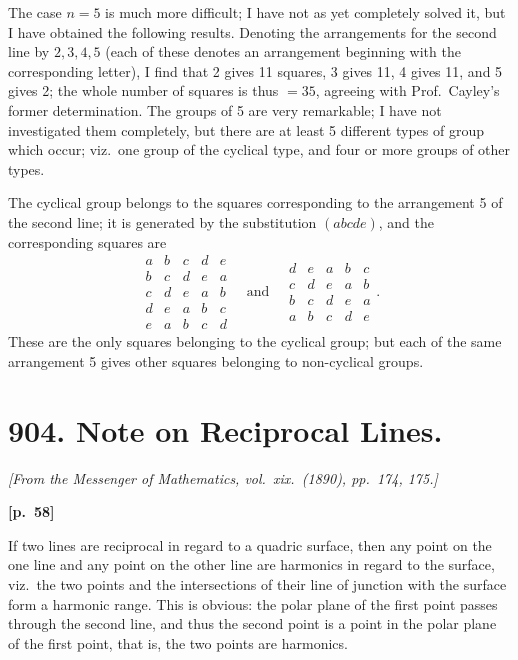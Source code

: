 \documentclass[11pt,a4paper]{book}
\begin{document}
The case $n = 5$ is much more difficult; I have not as yet completely solved it, but I have obtained the following results. Denoting the arrangements for the second line by $2, 3, 4, 5$ (each of these denotes an arrangement beginning with the corresponding letter), I find that 2 gives 11 squares, 3 gives 11, 4 gives 11, and 5 gives 2; the whole number of squares is thus $= 35$, agreeing with Prof.\ Cayley's former determination. The groups of 5 are very remarkable; I have not investigated them completely, but there are at least 5 different types of group which occur; viz.\ one group of the cyclical type, and four or more groups of other types.

The cyclical group belongs to the squares corresponding to the arrangement 5 of the second line; it is generated by the substitution $(abcde)$, and the corresponding squares are
$$
\begin{array}{ccccc}
a & b & c & d & e \\
b & c & d & e & a \\
c & d & e & a & b \\
d & e & a & b & c \\
e & a & b & c & d
\end{array}
\quad \text{and} \quad
\begin{array}{ccccc}
d & e & a & b & c \\
c & d & e & a & b \\
b & c & d & e & a \\
a & b & c & d & e
\end{array}.
$$
These are the only squares belonging to the cyclical group; but each of the same arrangement 5 gives other squares belonging to non-cyclical groups.

\newpage

\section*{904. Note on Reciprocal Lines.}

\noindent\textit{[From the Messenger of Mathematics, vol.\ xix.\ (1890), pp.\ 174, 175.]}

\vspace{0.5em}
\noindent\textbf{[p.\ 58]}

If two lines are reciprocal in regard to a quadric surface, then any point on the one line and any point on the other line are harmonics in regard to the surface, viz.\ the two points and the intersections of their line of junction with the surface form a harmonic range. This is obvious: the polar plane of the first point passes through the second line, and thus the second point is a point in the polar plane of the first point, that is, the two points are harmonics.
\end{document}
